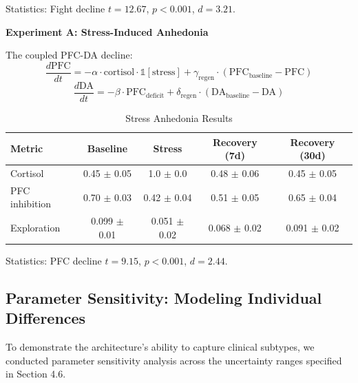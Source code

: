 \documentclass[preprint,12pt]{elsarticle}
\newcommand{\indicator}{\mathbb{1}}
\begin{document}
Statistics: Fight decline $t=12.67$, $p<0.001$, $d=3.21$.

\textbf{Experiment A: Stress-Induced Anhedonia}

\begin{definition}
The coupled PFC-DA decline:
\begin{equation}
\frac{d\text{PFC}}{dt} = -\alpha \cdot \text{cortisol} \cdot \indicator[\text{stress}] + \gamma_{\text{regen}} \cdot (\text{PFC}_{\text{baseline}} - \text{PFC})
\end{equation}
\begin{equation}
\frac{d\text{DA}}{dt} = -\beta \cdot \text{PFC}_{\text{deficit}} + \delta_{\text{regen}} \cdot (\text{DA}_{\text{baseline}} - \text{DA})
\end{equation}
\end{definition}

\begin{table}[htbp]
\centering
\caption{Stress Anhedonia Results}
\label{tab:anhedonia}
\begin{tabular}{lcccc}
\toprule
\textbf{Metric} & \textbf{Baseline} & \textbf{Stress} & \textbf{Recovery (7d)} & \textbf{Recovery (30d)} \\
\midrule
Cortisol & 0.45 $\pm$ 0.05 & 1.0 $\pm$ 0.0 & 0.48 $\pm$ 0.06 & 0.45 $\pm$ 0.05 \\
PFC inhibition & 0.70 $\pm$ 0.03 & 0.42 $\pm$ 0.04 & 0.51 $\pm$ 0.05 & 0.65 $\pm$ 0.04 \\
Exploration & 0.099 $\pm$ 0.01 & 0.051 $\pm$ 0.02 & 0.068 $\pm$ 0.02 & 0.091 $\pm$ 0.02 \\
\bottomrule
\end{tabular}
\end{table}

Statistics: PFC decline $t=9.15$, $p<0.001$, $d=2.44$.

\subsection{Parameter Sensitivity: Modeling Individual Differences}

To demonstrate the architecture's ability to capture clinical subtypes, we conducted parameter sensitivity analysis across the uncertainty ranges specified in Section 4.6.
\end{document}
